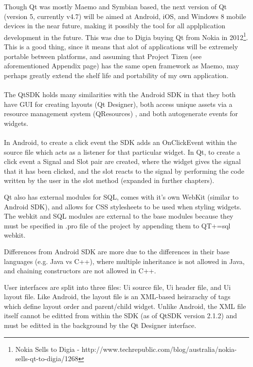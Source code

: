 Though Qt was mostly Maemo and Symbian based, the next version of Qt (version 5, currently v4.7) will be aimed at Android, iOS, and Windows 8 mobile devices in the near future, making it possibly the tool for all applplication development in the future. This was due to Digia buying Qt from Nokia in 2012\footnote{Nokia Sells to Digia - http://www.techrepublic.com/blog/australia/nokia-sells-qt-to-digia/1268}\label{ref:nokiasell}. This is a good thing, since it means that alot of applications will be extremely portable between platforms, and assuming that Project Tizen (see aforementioned Appendix page) has the same open framework as Maemo, may perhaps greatly extend the shelf life and portability of my own application.\\

\hspace{-20pt}{\bf Qt SDK}\\
The QtSDK holds many similarities with the Android SDK in that they both have GUI for creating layouts (Qt Designer), both access unique assets via a resource management system (QResources) , and both autogenerate events for widgets.\\

\hspace{-20pt}{\bf Android vs Qt}\\
In Android, to create a click event the SDK adds an OnClickEvent within the source file which acts as a listener for that particular widget. In Qt, to create a click event a Signal and Slot pair are created, where the widget gives the signal that it has been clicked, and the slot reacts to the signal by performing the code written by the user in the slot method (expanded in further chapters).

Qt also has external modules for SQL, comes with it's own WebKit (similar to Android SDK), and allows for CSS stylesheets to be used when styling widgets. The webkit and SQL modules are external to the base modules because they must be specified in .pro file of the project by appending them to QT+=sql webkit.

Differences from Android SDK are more due to the differences in their base languages (e.g. Java vs C++), where multiple inheritance is not allowed in Java, and chaining constructors are not allowed in C++.

User interfaces are split into three files: Ui source file, Ui header file, and Ui layout file. Like Android, the layout file is an XML-based heirarachy of tags which define layout order and parent/child widget. Unlike Android, the XML file itself cannot be editted from within the SDK (as of QtSDK version 2.1.2) and must be editted in the background by the Qt Designer interface.

